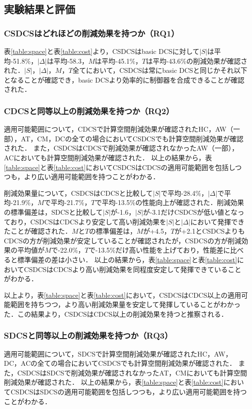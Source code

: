 

\subsection{実験結果と評価}

\subsubsection{CSDCSはどれほどの削減効果を持つか（RQ1）}
表\ref{table:space}と表\ref{table:cost}より，CSDCSはbasic DCSに対して$|S|$は平均-51.8\%，$|\Delta|$は平均-58.3，$M$は平均-45.1\%，$T$は平均-43.6\%の削減効果が確認された．$|S|$，$|\Delta|$，$M$，$T$全てにおいて，CSDCSは常にbasic DCSと同じかそれ以下となることが確認でき，basic DCSより効率的に制御器を合成できることが確認された．

\subsubsection{CDCSと同等以上の削減効果を持つか（RQ2）}
適用可能範囲について，CDCSで計算空間削減効果が確認されたHC，AW（一部），AT，CM，DCの全ての場合においてCSDCSでも計算空間削減効果が確認された．
また，CSDCSはCDCSで削減効果が確認されなかったAW（一部），ACにおいても計算空間削減効果が確認された．
以上の結果から，表\ref{table:space}と表\ref{table:cost}においてCSDCSはCDCSの適用可能範囲を包括しつつも，より広い適用可能範囲を持つことがわかる．

削減効果量について，CSDCSはCDCSと比較して$|S|$で平均-28.4\%，$|\Delta|$で平均-21.9\%，$M$で平均-21.7\%，$T$で平均-13.5\%の性能向上が確認された．削減効果の標準偏差は，SDCSと比較して$|S|$が-1.6，$|S|$が-3.1だけCSDCSが低い値となっており，CSDCSはCDCSより安定して高い削減効果を$|S|$と$|\Delta|$において発揮できたことが確認された．$M$と$T$の標準偏差は，$M$が+4.5，$T$が+2.1とCSDCSよりもCDCSの方が削減効果が安定していることが確認されたが，CSDCSの方が削減効果の平均値が$M$で-22.0\%，$T$で-13.5\%だけ高い性能を上げており，性能差に比べると標準偏差の差は小さい．
以上の結果から，表\ref{table:space}と表\ref{table:cost}においてCSDCSはCDCSより高い削減効果を同程度安定して発揮できていることがわかる．

以上より，表\ref{table:space}と表\ref{table:cost}において，CSDCSはCDCS以上の適用可能範囲を持ちつつ，より高い削減効果量を安定して発揮していることがわかった．この結果より，CSDCSはCDCS以上の削減効果を持つと推察される．

\subsubsection{SDCSと同等以上の削減効果を持つか（RQ3）}
適用可能範囲について，SDCSで計算空間削減効果が確認されたHC，AW，DC，ACの全ての場合においてCSDCSでも計算空間削減効果が確認された．
また，CSDCSはSDCSで削減効果が確認されなかったAT，CMにおいても計算空間削減効果が確認された．
以上の結果から，表\ref{table:space}と表\ref{table:cost}においてCSDCSはSDCSの適用可能範囲を包括しつつも，より広い適用可能範囲を持つことがわかる．

